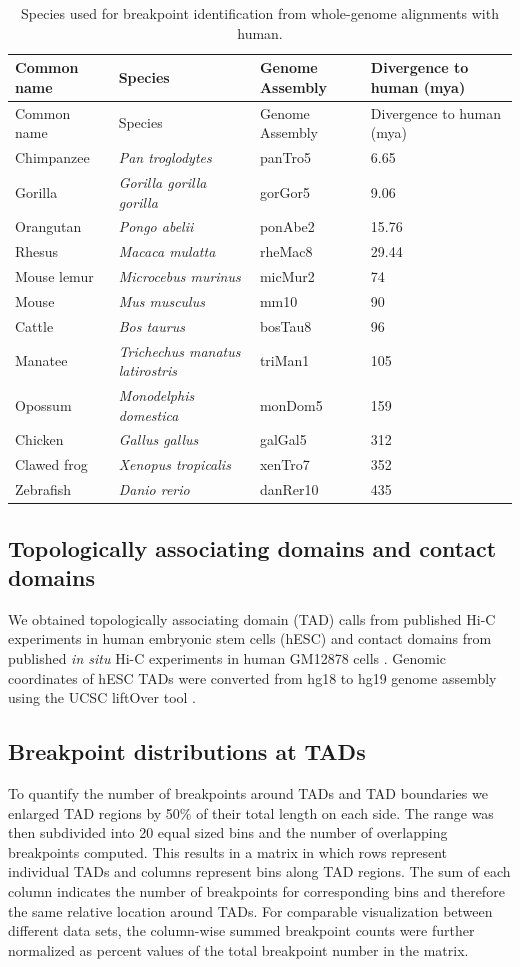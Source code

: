 \documentclass[a4paper,twoside=true,openright,parskip=full,chapterprefix=true,11pt,headings=normal,bibliography=totoc,listof=totoc,titlepage=on,captions=tableabove,draft=false]{scrreprt}
\theoremstyle{definition}
\theoremstyle{definition}
\theoremstyle{definition}
\theoremstyle{remark}
\begin{document}
\begin{longtable}[]{@{}llll@{}}
\caption{\label{tab:TadEvoSpecies} Species used for breakpoint
identification from whole-genome alignments with human. }\tabularnewline
\toprule
Common name & Species & Genome Assembly & Divergence to human
(mya)\tabularnewline
\midrule
\endfirsthead
\toprule
Common name & Species & Genome Assembly & Divergence to human
(mya)\tabularnewline
\midrule
\endhead
Chimpanzee & \emph{Pan troglodytes} & panTro5 & 6.65\tabularnewline
Gorilla & \emph{Gorilla gorilla gorilla} & gorGor5 & 9.06\tabularnewline
Orangutan & \emph{Pongo abelii} & ponAbe2 & 15.76\tabularnewline
Rhesus & \emph{Macaca mulatta} & rheMac8 & 29.44\tabularnewline
Mouse lemur & \emph{Microcebus murinus} & micMur2 & 74\tabularnewline
Mouse & \emph{Mus musculus} & mm10 & 90\tabularnewline
Cattle & \emph{Bos taurus} & bosTau8 & 96\tabularnewline
Manatee & \emph{Trichechus manatus latirostris} & triMan1 &
105\tabularnewline
Opossum & \emph{Monodelphis domestica} & monDom5 & 159\tabularnewline
Chicken & \emph{Gallus gallus} & galGal5 & 312\tabularnewline
Clawed frog & \emph{Xenopus tropicalis} & xenTro7 & 352\tabularnewline
Zebrafish & \emph{Danio rerio} & danRer10 & 435\tabularnewline
\bottomrule
\end{longtable}

\hypertarget{topologically-associating-domains-and-contact-domains}{%
\subsection{Topologically associating domains and contact
domains}\label{topologically-associating-domains-and-contact-domains}}

We obtained topologically associating domain (TAD) calls from published
Hi-C experiments in human embryonic stem cells (hESC) \citep{Dixon2012}
and contact domains from published \emph{in situ} Hi-C experiments in
human GM12878 cells \citep{Rao2014}. Genomic coordinates of hESC TADs
were converted from hg18 to hg19 genome assembly using the UCSC liftOver
tool \citep{Hinrichs2006}.

\hypertarget{breakpoint-distributions-at-tads}{%
\subsection{Breakpoint distributions at
TADs}\label{breakpoint-distributions-at-tads}}

To quantify the number of breakpoints around TADs and TAD boundaries we
enlarged TAD regions by 50\% of their total length on each side. The
range was then subdivided into 20 equal sized bins and the number of
overlapping breakpoints computed. This results in a matrix in which rows
represent individual TADs and columns represent bins along TAD regions.
The sum of each column indicates the number of breakpoints for
corresponding bins and therefore the same relative location around TADs.
For comparable visualization between different data sets, the
column-wise summed breakpoint counts were further normalized as percent
values of the total breakpoint number in the matrix.
\end{document}
